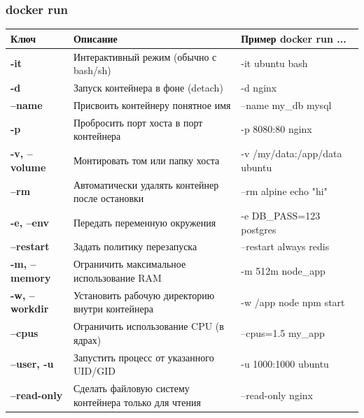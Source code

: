 \documentclass[9pt, aspectratio=1610]{beamer}
\begin{document}
\begin{frame}\frametitle{docker run}
	
	\small\sloppy
	\begin{tabularx}{\linewidth}{>{\ttfamily\bfseries}lp{5cm}>{\ttfamily}X}
		\textbf{\rmfamily Ключ} & \textbf{Описание} & \textbf{\textrm{Пример} docker run ...} \\\hline
		-it & Интерактивный режим (обычно с bash/sh) &   -it ubuntu bash \\
		-d & Запуск контейнера в фоне (detach) &   -d nginx \\
		--name & Присвоить контейнеру понятное имя &   --name my\_db mysql \\
		-p & Пробросить порт хоста в порт контейнера &   -p 8080:80 nginx \\
		-v, --volume & Монтировать том или папку хоста &   -v /my/data:/app/data ubuntu \\
		--rm & Автоматически удалять контейнер после остановки &   --rm alpine echo "hi" \\
		-e, --env & Передать переменную окружения &   -e DB\_PASS=123 postgres \\
		--restart & Задать политику перезапуска &   --restart always redis \\
		-m, --memory & Ограничить максимальное использование RAM &   -m 512m node\_app \\
		-w, --workdir & Установить рабочую директорию внутри контейнера &   -w /app node npm start \\
		--cpus & Ограничить использование CPU (в ядрах) &   --cpus=1.5 my\_app \\
		--user, -u & Запустить процесс от указанного UID/GID &   -u 1000:1000 ubuntu \\
		--read-only & Сделать файловую систему контейнера только для чтения &   --read-only nginx \\
	\end{tabularx}
	
\end{frame}
\end{document}
